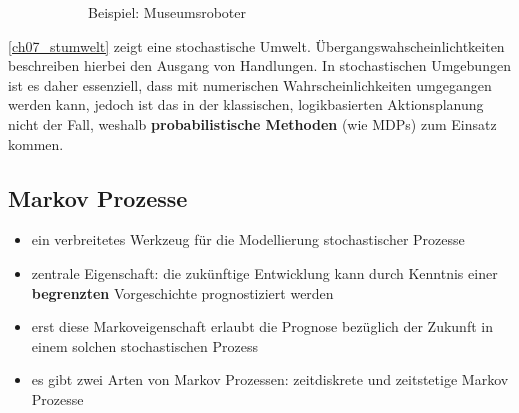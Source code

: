 \begin{figure}[ht]
\begin{subfigure}{.4\textwidth}
		\caption{Beispiel: Museumsroboter}
		\label{ch07_umwelt-bsp}
	\end{subfigure}
	\caption{}
\end{figure}

\autoref{ch07_stumwelt} zeigt eine stochastische Umwelt.
\"Ubergangswahscheinlichtkeiten beschreiben hierbei den Ausgang von Handlungen.
In stochastischen Umgebungen ist es daher essenziell, dass mit numerischen Wahrscheinlichkeiten umgegangen werden kann, jedoch ist das in der klassischen, logikbasierten Aktionsplanung nicht der Fall, weshalb \textbf{probabilistische Methoden} (wie MDPs) zum Einsatz kommen.
\subsection{Markov Prozesse}
\begin{itemize}
\item ein verbreitetes Werkzeug f\"ur die Modellierung stochastischer Prozesse
\item zentrale Eigenschaft: die zuk\"unftige Entwicklung kann durch Kenntnis einer \textbf{begrenzten} Vorgeschichte prognostiziert werden
\item erst diese Markoveigenschaft erlaubt die Prognose bez\"uglich der Zukunft in einem solchen stochastischen Prozess
\item es gibt zwei Arten von Markov Prozessen: zeitdiskrete und zeitstetige Markov Prozesse
\end{itemize}

